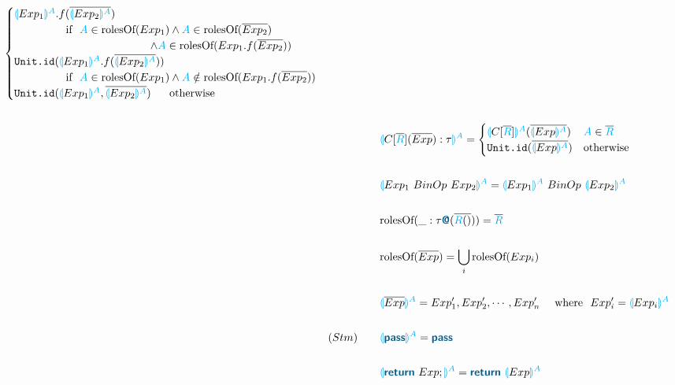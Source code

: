 \documentclass{thesis}
\newcommand{\projection}[2]{{\color{cyan}\llparenthesis}#1{\color{cyan}\rrparenthesis^#2}}
\newcommand{\mblue}[1]{\textbf{\textsf{\color{MidnightBlue}#1}}}
\begin{document}
\begin{alignat*}{2}
  \begin{cases}
    \projection{Exp_1}{A}.f(\overline{\projection{Exp_2}{A}}) \\
    ~~~~~~~~~~~~~~\text{if}~~ {\color{cyan}A} \in \text{rolesOf}(Exp_1) \wedge {\color{cyan}A} \in \text{rolesOf}(\overline{Exp_2})\\
    ~~~~~~~~~~~~~~~~~~~~~~~~~~~~~~~~~~~~~ \wedge {\color{cyan}A} \in \text{rolesOf}(Exp_1.f(\overline{Exp_2}))\\
    \texttt{Unit.id}(\projection{Exp_1}{A}.f(\overline{\projection{Exp_2}{A}})) \\
    ~~~~~~~~~~~~~~\text{if}~~ {\color{cyan}A} \in \text{rolesOf}(Exp_1) \wedge {\color{cyan}A} \notin \text{rolesOf}(Exp_1.f(\overline{Exp_2}))\\
    \texttt{Unit.id}(\projection{Exp_1}{A},\overline{\projection{Exp_2}{A}}) ~~~~~\text{otherwise}
  \end{cases}\\
  \\
  &&&\projection{C[\overline{\color{cyan}R}](\overline{Exp}):\tau}{A}=
  \begin{cases}
    \projection{C[\overline{\color{cyan}R}]}{A} (\overline{\projection{Exp}{A}}) & {\color{cyan}A} \in \overline{\color{cyan}R}\\
    \texttt{Unit.id}(\overline{\projection{Exp}{A}}) &\text{otherwise}
  \end{cases}\\
  \\
  &&&\projection{Exp_1 ~BinOp~ Exp_2}{A} = \projection{Exp_1}{A} ~BinOp~ \projection{Exp_2}{A}\\
  \\
  &&&\text{rolesOf}(\_:\tau\mblue{@}(\overline{{\color{cyan}{R}}()})) = {\overline{\color{cyan}R}}\\
  \\
  &&&\text{rolesOf}(\overline{Exp}) = \bigcup_i \text{rolesOf}(Exp_i) \\
  \\
  &&&\projection{\overline{Exp}}{A} = Exp'_1,Exp'_2,\cdots,Exp'_n ~~~~\text{where}~~ Exp'_i = \projection{Exp_i}{A}\\ 
  \\
  &(Stm)~~~ &&\projection{\mblue{pass}}{A} = \mblue{pass}\\
  \\
  &&&\projection{\mblue{return} ~ Exp;}{A} = \mblue{return} ~ \projection{Exp}{A}\\

\end{alignat*}
\end{document}
